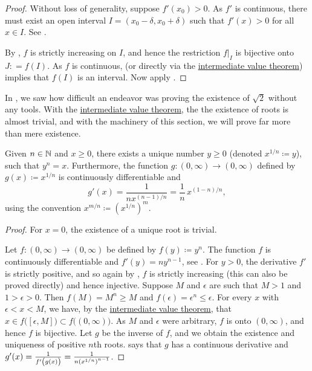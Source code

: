 \begin{proof}
Without loss of generality, suppose $f'(x_0) > 0$.  As $f'$ is
continuous, there must exist an open interval $I = (x_0-\delta,x_0+\delta)$ 
such that $f'(x) > 0$ for all $x \in I$.  See
.

By , $f$ is strictly increasing
on $I$, and hence the restriction $f|_{I}$ is bijective onto $J: = f(I)$.
As $f$ is continuous,
(or directly via the
\hyperref[IVT:thm]{intermediate value theorem})
implies that
$f(I)$ is an interval.
Now apply .
\end{proof}

In , we saw how difficult an
endeavor was proving the existence of $\sqrt{2}$ without any
tools.
With the \hyperref[IVT:thm]{intermediate value theorem},
the the existence of roots is almost trivial, and
with the machinery of this section, we will prove
far more than mere existence.

\begin{cor}
Given $n \in {\mathbb{N}}$ and $x \geq 0$, there exists a unique 
number $y \geq 0$ (denoted $x^{1/n} \coloneqq y$), such that $y^n = x$.  Furthermore,
the function $g \colon (0,\infty) \to (0,\infty)$ defined by
$g(x) \coloneqq x^{1/n}$ is continuously differentiable and
\begin{equation*}
g'(x) = \frac{1}{nx^{(n-1)/n}} = \frac{1}{n} \, x^{(1-n)/n} ,
\end{equation*}
using the convention $x^{m/n} \coloneqq {(x^{1/n})}^{m}$.
\end{cor}

\begin{proof}
For $x=0$, the existence of a unique root is trivial.

Let $f \colon (0,\infty) \to (0,\infty)$ be defined by $f(y) \coloneqq y^n$.
The function $f$ is continuously differentiable
and $f'(y) = ny^{n-1}$, see .
For $y > 0$, the derivative $f'$ is strictly positive,
and so again by , $f$ is strictly
increasing (this can also be proved directly) and hence injective.
Suppose $M$ and $\epsilon$ are such that
$M > 1$ and $1 > \epsilon > 0$.
Then
$f(M) = M^n \geq M$ and
$f(\epsilon) = \epsilon^n \leq \epsilon$.
For every $x$ with $\epsilon < x < M$,
we have, by the
\hyperref[IVT:thm]{intermediate value theorem}, that $x \in
f\bigl( [\epsilon,M] \bigr) \subset
f\bigl( (0,\infty) \bigr)$.  As $M$ and $\epsilon$ were arbitrary, $f$ is onto
$(0,\infty)$, and hence $f$ is bijective.
Let $g$ be the inverse of $f$, and we obtain
the existence and uniqueness of positive
$n$th roots.   says that $g$ has a continuous
derivative and $g'(x) =
\frac{1}{f'\left(\vphantom{1^1_1}g(x)\right)} = \frac{1}{n {(x^{1/n})}^{n-1}}$.
\end{proof}

